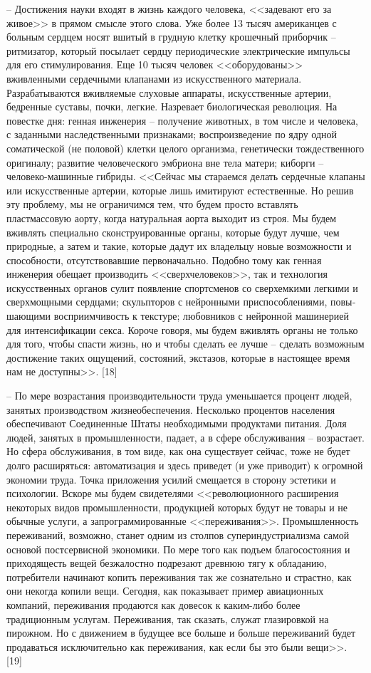 \documentclass{book}
\begin{document}
-- Достижения науки входят в жизнь каждого человека, <<задевают его за живое>> в прямом смысле этого слова. Уже бо­лее 13 тысяч американцев с больным сердцем носят вшитый в грудную клетку крошечный приборчик -- ритмизатор, который посылает сердцу периодические электрические импульсы для его стимулирования. Еще 10 тысяч человек <<оборудованы>> вживленными сердечными клапанами из искусственного материала. Разрабатываются вживляемые слуховые аппараты, искусственные артерии, бедренные суставы, почки, легкие. Назревает биологическая революция. На повестке дня: генная инже­нерия -- получение животных, в том числе и человека, с заданными наследственными признаками; воспроизведение по ядру одной соматической (не половой) клетки целого организма, генетически тождественного оригиналу; развитие человеческого эмбриона вне тела матери; киборги -- человеко-машинные гибриды. <<Сейчас мы стараемся делать сердечные клапаны или искусственные артерии, которые лишь имитируют естественные. Но решив эту проблему, мы не ограничимся тем, что будем просто вставлять пластмассовую аорту, когда натуральная аорта выходит из строя. Мы будем вживлять специально сконструированные органы, которые будут лучше,  чем природные, а затем и такие, которые дадут их владельцу новые возможности и способности, отсутствовавшие первоначально. Подобно тому как генная инженерия обещает производить <<сверхчеловеков>>, так и технология искусственных органов сулит появление спортсменов со сверхемкими легкими и сверхмощными серд­цами; скульпторов с нейронными приспособлениями, повы­шающими восприимчивость к текстуре; любовников с ней­ронной машинерией для интенсификации секса. Короче говоря, мы будем вживлять органы не только для того, чтобы спасти жизнь, но и чтобы сделать ее лучше -- сделать возможным дости­жение таких ощущений, состояний, экстазов, которые в насто­ящее время нам не доступны>>. [18]

-- По мере возрастания производительности труда уменьша­ется процент людей, занятых производством жизнеобеспечения. Несколько процентов населения обеспечивают Соединен­ные Штаты необходимыми продуктами питания. Доля людей, занятых в промышленности, падает, а в сфере обслуживания -- возрастает. Но сфера обслуживания, в том виде, как она су­ществует сейчас, тоже не будет долго расширяться: автомати­зация и здесь приведет (и уже приводит) к огромной экономии труда. Точка приложения усилий смещается в сторону эстетики и психологии. Вскоре мы будем свидетелями <<революционного расширения некоторых видов промышленности, продукцией которых будут не товары и не обычные услуги, а запрограммированные <<переживания>>. Промышленность переживаний, возможно, станет одним из столпов супериндустриализма самой основой постсервисной экономики. По мере того как подъем благосостояния и приходящесть вещей безжалостно подрезают древнюю тягу к обладанию, потребители начинают копить переживания так же сознательно и страстно, как они 
некогда копили вещи. Сегодня, как показывает пример авиаци­онных компаний, переживания продаются как довесок к каким-либо более традиционным услугам. Переживания, так сказать, служат глазировкой на пирожном. Но с движением в будущее все больше и больше переживаний будет продаваться исклю­чительно как переживания, как если бы это были вещи>>. [19]
\end{document}
